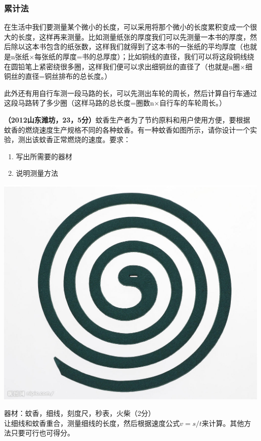 \documentclass[12pt]{exam}%
\begin{document}
\begin{knowledge}
\subsubsection{累计法}
在生活中我们要测量某个微小的长度，可以采用将那个微小的长度累积变成一个很大的长度，这样再来测量。比如测量纸张的厚度我们可以先测量一本书的厚度，然后除以这本书包含的纸张数，这样我们就得到了这本书的一张纸的平均厚度（也就是n张纸$\times$每张纸的厚度=书的总厚度）；比如铜线的直径，我们可以将这段铜线绕在圆铅笔上紧密绕很多圈，这样我们便可以求出细铜丝的直径了（也就是n圈$\times$细铜丝的直径=铜丝排布的总长度。）

此外还有用自行车测一段马路的长，可以先测出车轮的周长，然后计算自行车通过这段马路转了多少圈（这样马路的总长度=圈数n$\times$自行车的车轮周长。）

\textbf{（2012山东潍坊，23，5分）}蚊香生产者为了节约原料和用户使用方便，要根据蚊香的燃烧速度生产规格不同的各种蚊香。有一种蚊香如图所示，请你设计一个实验，测出该蚊香正常燃烧的速度。要求：
\begin{multicols}{2}
\begin{enumerate}
\item 写出所需要的器材
\item 说明测量方法
\end{enumerate}
\columnbreak
\hfill\includegraphics[scale=0.1]{figures/蚊香.jpg} 
\end{multicols}
\pagebreak
\begin{solutionorbox}[12ex]
器材：蚊香，细线，刻度尺，秒表，火柴（2分）\\
让细线和蚊香重合，测量细线的长度，然后根据速度公式$v=s/t$来计算。其他方法只要可行也可得分。
\end{solutionorbox}




\end{knowledge}
\end{document}
